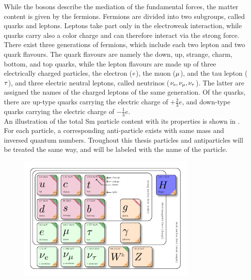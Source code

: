 While the bosons describe the mediation of the fundamental forces, the matter content is given by the fermions. Fermions are divided into two subgroups, called quarks and leptons. Leptons take part only in the electroweak interaction, while quarks carry also a color charge and can therefore interact via the strong force. There exist three generations of fermions, which include each two lepton and two quark flavours. The quark flavours are namely the down, up, strange, charm, bottom, and top quarks, while the lepton flavours are made up of three electrically charged particles, the electron ($\mathrm{e}$), the muon ($\mu$), and the tau lepton ($\tau$), and three electric neutral leptons, called neutrinos ($\nu_\mathrm{{e}},\nu_{\mu},\nu_{\tau}$). The latter are assigned the names of the charged leptons of the same generation. Of the quarks, there are up-type quarks carrying the electric charge of $+\frac{2}{3}e$, and down-type quarks carrying the electric charge of $-\frac{1}{3}e$.\\
An illustration of the total Sm particle content with its properties is shown in .
For each particle, a corresponding anti-particle exists with same mass and inversed quantum numbers. Troughout this thesis particles and antiparticles will be treated the same way, and will be labeled with the name of the particle.\\

\begin{figure}[!htpb]
\centering
  \includegraphics[width=0.8\textwidth]{figures/general/SM}
  \caption{}
  \label{fig:SM}

\end{figure}


